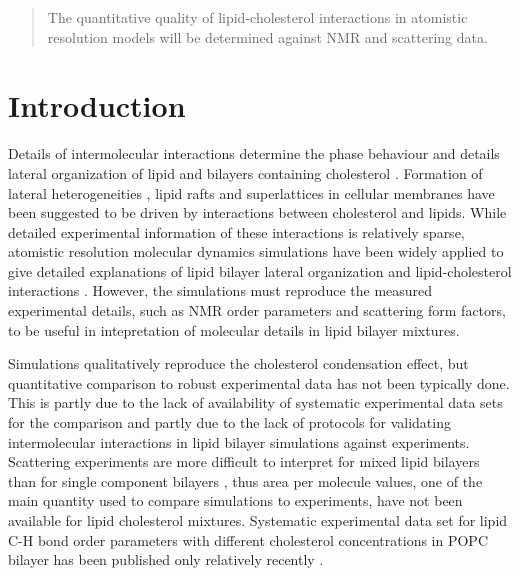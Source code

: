 \documentclass[aps,prl,superscriptaddress,twocolumn]{revtex4}
\begin{document}
\date{\today}

\begin{abstract}
The quantitative quality of lipid-cholesterol interactions in atomistic resolution models will be determined against 
NMR and scattering data.
\end{abstract}


\maketitle %



\section{Introduction}


Details of intermolecular interactions determine the phase
behaviour and details lateral organization of lipid and bilayers
containing cholesterol \cite{ipsen87}.
Formation of lateral heterogeneities \cite{kinnunen91}, lipid rafts \cite{simons97}
and superlattices \cite{somerharju09} in cellular membranes have been
suggested to be driven by interactions between cholesterol
and lipids. While detailed experimental information of these interactions
is relatively sparse, atomistic resolution molecular dynamics simulations
have been widely applied to give detailed explanations of lipid bilayer
lateral organization and lipid-cholesterol interactions \cite{rog14,sodt14,??}.
However, the simulations must reproduce the measured experimental details, such as NMR
order parameters and scattering form factors, to be useful in intepretation
of molecular details in lipid bilayer mixtures.

Simulations qualitatively reproduce the cholesterol condensation effect,
but quantitative comparison to robust experimental data has not been
typically done. This is partly due to the lack of availability of
systematic experimental data sets for the comparison and partly
due to the lack of protocols for validating intermolecular interactions
in lipid bilayer simulations against experiments.
Scattering experiments are more difficult to interpret for
mixed lipid bilayers than for single component bilayers \cite{pan12,Heftberger15,Marquardt15,??},
thus area per molecule values, one of the main quantity used to
compare simulations to experiments, have not been
available for lipid cholesterol mixtures. Systematic experimental
data set for lipid C-H bond order parameters with different cholesterol
concentrations in POPC bilayer has been published only relatively recently \cite{ferreira13}.
\end{document}
